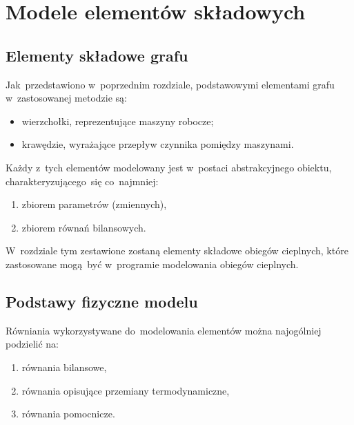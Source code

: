\section{Modele elementów składowych}

\subsection{Elementy składowe grafu}

Jak~przedstawiono w~poprzednim rozdziale, podstawowymi elementami grafu
w~zastosowanej metodzie są:

\begin{itemize}

	\item wierzchołki, reprezentujące maszyny robocze;

	\item krawędzie, wyrażające przepływ czynnika pomiędzy maszynami.

\end{itemize}

Każdy z~tych elementów modelowany jest w~postaci abstrakcyjnego obiektu,
charakteryzującego~się co~najmniej:

\begin{enumerate}

	\item zbiorem parametrów (zmiennych),

	\item zbiorem równań bilansowych.

\end{enumerate}

W~rozdziale tym zestawione zostaną elementy składowe obiegów cieplnych,
które zastosowane mogą~być w~programie modelowania obiegów cieplnych.


\subsection{Podstawy fizyczne modelu}

Równiania wykorzystywane do~modelowania elementów można najogólniej
podzielić na:

\begin{enumerate}

	\item równania bilansowe,

	\item równania opisujące przemiany termodynamiczne,

	\item równania pomocnicze.

\end{enumerate}

